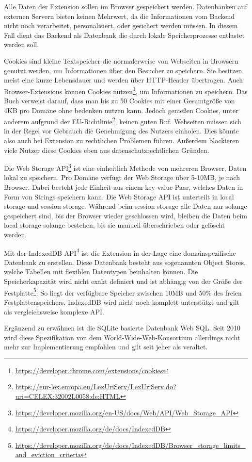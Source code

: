 Alle Daten der Extension sollen im Browser gespeichert werden. Datenbanken auf externen Servern bieten keinen Mehrwert, da die Informationen vom Backend nicht noch verarbeitet, personalisiert, oder gesichert werden müssen. In diesem Fall dient das Backend als Datenbank die durch lokale Speicherprozesse entlastet werden soll.

Cookies sind kleine Textspeicher die normalerweise von Webseiten in Browsern genutzt werden, um Informationen über den Besucher zu speichern. Sie besitzen meist eine kurze Lebensdauer und werden über HTTP-Header übertragen. Auch Browser-Extensions können Cookies nutzen\footnote{\url{https://developer.chrome.com/extensions/cookies}}, um Informationen zu speichern. Das Buch verweist darauf, dass man bis zu 50 Cookies mit einer Gesamtgröße von 4KB pro Domäne ohne bedenken nutzen kann.
Jedoch genießen Cookies, unter anderem aufgrund der EU-Richtlinie\footnote{\url{https://eur-lex.europa.eu/LexUriServ/LexUriServ.do?uri=CELEX:32002L0058:de:HTML}}, keinen guten Ruf. Webseiten müssen sich in der Regel vor Gebrauch die Genehmigung des Nutzers einholen. Dies könnte also auch bei Extension zu rechtlichen Problemen führen. Außerdem blockieren viele Nutzer diese Cookies eben aus datenschutzrechtlichen Gründen.

Die Web Storage API\footnote{\url{https://developer.mozilla.org/en-US/docs/Web/API/Web_Storage_API}} ist eine einheitlich Methode von mehreren Browser, Daten lokal zu speichern. Pro Domäne verfügt der Web Storage über 5-10MB, je nach Browser. Dabei besteht jede Einheit aus einem key-value-Paar, welches Daten in Form von Strings speichern kann. Die Web Storage API ist unterteilt in \glqq local storage\grqq{} und \glqq session storage\grqq{}. Während beim session storage alle Daten nur solange gespeichert sind, bis der Browser wieder geschlossen wird, bleiben die Daten beim local storage solange bestehen, bis sie manuell überschrieben oder gelöscht werden.

Mit der IndexedDB API\footnote{\url{https://developer.mozilla.org/de/docs/IndexedDB}} ist die Extension in der Lage eine domainspezifische Datenbank zu erstellen. Diese Datenbank besteht aus sogenannten \glqq Object Stores\grqq{}, welche Tabellen mit flexiblen Datentypen beinhalten können. Die Speicherkapazität wird nicht exakt definiert und ist abhängig von der Größe der Festplatte\footnote{\url{https://developer.mozilla.org/de/docs/IndexedDB/Browser_storage_limits_and_eviction_criteria}}. So liegt der verfügbare Speicher zwischen 10MB und 50\% des freien Festplattenspeichers. IndexedDB wird nicht noch komplett unterstützt und gilt als vergleichsweise komplexe API.

Ergänzend zu erwähnen ist die SQLite basierte Datenbank Web SQL. Seit 2010 wird diese Spezifikation von dem World-Wide-Web-Konsortium allerdings nicht mehr zur Implementierung empfohlen und gilt seit jeher als veraltet.
















